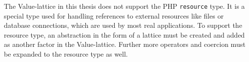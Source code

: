 The Value-lattice in this thesis does not support the PHP \texttt{resource} type. It is a special type used for handling references to external resources like files or database connections, which are used by most real applications. To support the resource type, an abstraction in the form of a lattice must be created and added as another factor in the Value-lattice. Further more operators and coercion must be expanded to the resource type as well.

